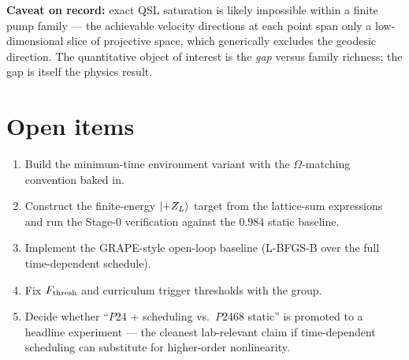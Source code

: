 \documentclass[11pt]{article}
\begin{document}
\textbf{Caveat on record:} exact QSL saturation is likely impossible within a finite pump family --- the achievable velocity directions at each point span only a low-dimensional slice of projective space, which generically excludes the geodesic direction. The quantitative object of interest is the \emph{gap} versus family richness; the gap is itself the physics result.

\section{Open items}

\begin{enumerate}
  \item Build the minimum-time environment variant with the $\Omega$-matching convention baked in.
  \item Construct the finite-energy $\ket{+Z_L}$ target from the lattice-sum expressions and run the Stage-0 verification against the $0.984$ static baseline.
  \item Implement the GRAPE-style open-loop baseline (L-BFGS-B over the full time-dependent schedule).
  \item Fix $F_{\rm thresh}$ and curriculum trigger thresholds with the group.
  \item Decide whether ``$P24$ + scheduling vs.\ $P2468$ static'' is promoted to a headline experiment --- the cleanest lab-relevant claim if time-dependent scheduling can substitute for higher-order nonlinearity.
\end{enumerate}
\end{document}

